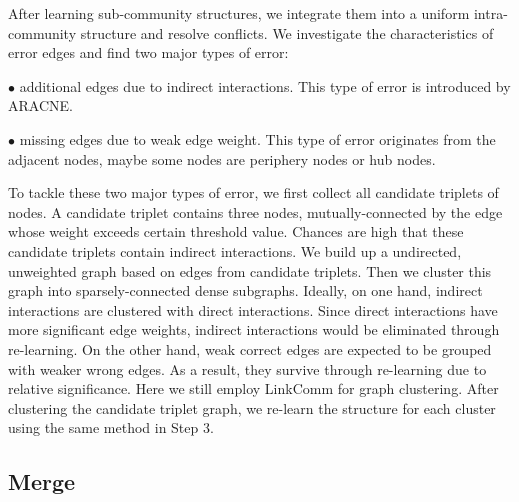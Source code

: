 After learning sub-community structures, we integrate them into a uniform intra-community structure and resolve conflicts. We investigate the characteristics of error edges and find two major types of error:

$\bullet$ additional edges due to indirect interactions. This type of error is introduced by ARACNE\cite{DBLP:journals/bmcbi/MargolinNBWSFC06}. %

$\bullet$ missing edges due to weak edge weight. This type of error originates from the adjacent nodes, maybe some nodes are periphery nodes or hub nodes.

To tackle these two major types of error, we first collect all candidate triplets of nodes. A candidate triplet contains three nodes, mutually-connected by the edge whose weight exceeds certain threshold value. Chances are high that these candidate triplets contain indirect interactions\cite{DBLP:journals/bmcbi/MargolinNBWSFC06}. We build up a undirected, unweighted graph based on edges from candidate triplets. Then we cluster this graph into sparsely-connected dense subgraphs. Ideally, on one hand, indirect interactions are clustered with direct interactions. Since direct interactions have more significant edge weights, indirect interactions would be eliminated through re-learning. On the other hand, weak correct edges are expected to be grouped with weaker wrong edges. As a result, they survive through re-learning due to relative significance. Here we still employ LinkComm\cite{YY_LC_nature2010} for graph clustering. After clustering the candidate triplet graph, we re-learn the structure for each cluster using the same method in Step 3.

\subsection{Merge}
\label{merge}

